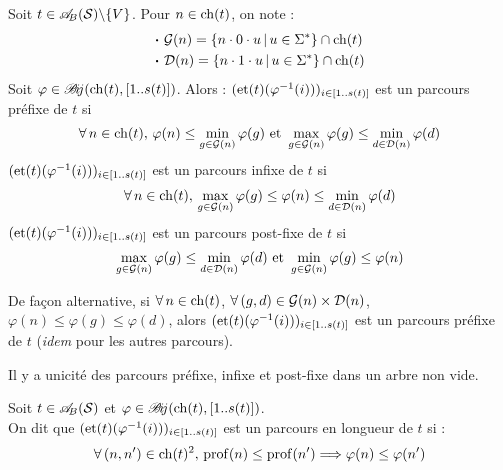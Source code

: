 		\eqskip{2mm}
		\begin{Definition}
			Soit \(t\in\ABS\backslash\{V\}\). Pour \(n\in\ch(t)\), on note :
				\begin{align*}
					& \text{\bdot} \cal{G}(n) = \{n \cdot 0 \cdot u \,|\, u\in\Sigma^*\} \cap \ch(t) \\
					& \text{\bdot} \cal{D}(n) = \{n \cdot 1 \cdot u \,|\, u\in\Sigma^*\} \cap \ch(t)
				\end{align*}
			Soit \(\varphi\in\Bij(\ch(t),[1..s(t)])\). Alors : \nt
			 \bdot \((\et(t)(\varphi^{-1}(i)))_{i\in[1..s(t)]}\) est un parcours préfixe de \(t\) si
				\[
					\forall\,n\in\ch(t),\, \varphi(n) \leq \min_{g\in\cal{G}(n)} \varphi(g) \text{ et } \max_{g\in\cal{G}(n)} \varphi(g) \leq \min_{d\in\cal{D}(n)}\varphi(d)
				\]
			 \bdot \((\et(t)(\varphi^{-1}(i)))_{i\in[1..s(t)]}\) est un parcours infixe de \(t\) si
				\[
					\forall\,n\in\ch(t),\, \max_{g\in\cal{G}(n)} \varphi(g) \leq \varphi(n) \leq \min_{d\in\cal{D}(n)}\varphi(d)
				\]
			 \bdot \((\et(t)(\varphi^{-1}(i)))_{i\in[1..s(t)]}\) est un parcours post-fixe de \(t\) si
				\[
					\max_{g\in\cal{G}(n)} \varphi(g) \leq \min_{d\in\cal{D}(n)}\varphi(d) \text{ et } \min_{g\in\cal{G}(n)} \varphi(g) \leq \varphi(n)
				\]
		\end{Definition}
		
		\begin{Remarque}
			De façon alternative, si \(\forall\,n\in\ch(t)\), \(\forall\,(g,d) \in \cal{G}(n)\times\cal{D}(n)\), \(\varphi(n) \leq \varphi(g) \leq \varphi(d)\), alors \((\et(t)(\varphi^{-1}(i)))_{i\in[1..s(t)]}\) est un parcours préfixe de \(t\) (\emph{idem} pour les autres parcours).
		\end{Remarque}
		
		\begin{Propriete}
			Il y a unicité des parcours préfixe, infixe et post-fixe dans un arbre non vide.
		\end{Propriete}	
		
		\begin{Exemple}
			
		\end{Exemple}
	
		\begin{Definition}
			Soit \(t\in\ABS\) et \(\varphi\in\Bij(\ch(t),[1..s(t)])\). \\
			On dit que \((\et(t)(\varphi^{-1}(i)))_{i\in[1..s(t)]}\) est un parcours en longueur de \(t\) si :
				\[
					\forall\,(n,n') \in\ch(t)^2,\, \prof(n) \leq \prof(n') \Longrightarrow \varphi(n) \leq \varphi(n')
				\]
		\end{Definition}
		
